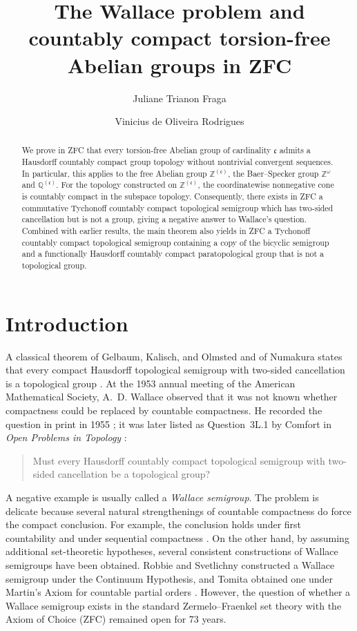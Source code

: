 \documentclass[11pt]{amsart}
\title[The Wallace problem and torsion-free groups]
{The Wallace problem and countably compact torsion-free
Abelian groups in ZFC}
\author{Juliane Trianon Fraga}
\author{Vinicius de Oliveira Rodrigues}
\date{}
\theoremstyle{definition}
\newcommand{\Z}{\mathbb Z}
\newcommand{\Q}{\mathbb Q}
\newcommand{\cfrak}{\mathfrak c}
\begin{document}
\begin{abstract}
We prove in ZFC that every torsion-free Abelian group of cardinality
$\cfrak$ admits a Hausdorff countably compact group topology without
nontrivial convergent sequences.  In particular, this applies to the free
Abelian group $\Z^{(\cfrak)}$, the Baer--Specker group $\Z^\omega$ and
$\Q^{(\cfrak)}$. For the topology constructed on $\Z^{(\cfrak)}$, the
coordinatewise nonnegative cone is countably compact in the subspace
topology. Consequently, there exists
in ZFC a commutative Tychonoff countably compact topological semigroup
which has two-sided cancellation but is not a group, giving a negative
answer to Wallace's question. Combined with earlier results, the main
theorem also yields in ZFC a Tychonoff countably compact topological
semigroup containing a copy of the bicyclic semigroup and a functionally
Hausdorff countably compact paratopological group that is not a
topological group.
\end{abstract}

\maketitle

\section{Introduction}

A classical theorem of Gelbaum, Kalisch, and Olmsted and of Numakura states
that every compact Hausdorff topological semigroup with two-sided cancellation
is a topological group
\cite{GelbaumKalischOlmsted1951,Numakura1952}.  At the 1953 annual meeting of
the American Mathematical Society, A.~D. Wallace observed that it was not
known whether compactness could be replaced by countable compactness.  He
recorded the question in print in 1955 \cite[p.~101]{Wallace1955}; it was later
listed as Question~3L.1 by Comfort in \emph{Open Problems in Topology}
\cite{Comfort1990}:

\begin{quote}
Must every Hausdorff countably compact topological semigroup with two-sided
cancellation be a topological group?
\end{quote}

A negative example is usually called a \emph{Wallace semigroup}.  The problem
is delicate because several natural strengthenings of countable compactness do
force the compact conclusion.  For example, the conclusion holds under first
countability and under sequential compactness
\cite{MukherjeaTserpes1972,Grant1993}.  On the other hand,
by assuming additional set-theoretic hypotheses, several consistent
constructions of Wallace semigroups have been obtained.  Robbie and
Svetlichny constructed a Wallace semigroup under the Continuum Hypothesis, and
Tomita obtained one under Martin's Axiom for countable partial orders
\cite{RobbieSvetlichny1996,Tomita1996Wallace}.  However, the question of
whether a Wallace semigroup exists in the standard Zermelo--Fraenkel set
theory with the Axiom of Choice (ZFC) remained open for 73 years.
\end{document}
